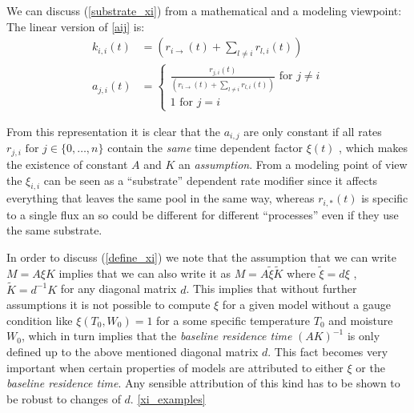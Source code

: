 We can discuss (\ref{substrate_xi}) from a mathematical and a modeling viewpoint:
\newcommand{\kiit}{
      \left(
      r_{i \rightarrow } (t)
      + 
      \sum_{l \ne i} r_{l,i} (t)
      \right)
}
The linear version of \eqref{aij} is: 
\begin{align}
  k_{i,i}(t) &=\kiit \nonumber
  \\
  a_{j,i}(t) &=\left\{
  \begin{matrix}
  \frac{
    r_{j,i} (t)
  }{
    \kiit
  } \text{ for } j \ne i
  \\
  1 \text{ for } j=i
  \end{matrix}
  \right.
  \label{aij}
\end{align}

From this representation it is clear that the $a_{i,j}$ are only constant if all rates $r_{j,i} \text{ for } j \in \{0,\dots ,n \}$ contain the \emph{same} time dependent factor $\xi(t)$ , which makes the existence of constant $A$ and $K$ 
an \emph{assumption}.
From a modeling point of view the $\xi_{i,i}$ can be seen as a ``substrate'' dependent rate modifier since it affects everything that leaves the same pool in the same way, whereas $r_{i,*}(t)$ is specific to a single flux an so could be different for different ``processes'' even if they use the same substrate.


In order to discuss (\ref{define_xi}) we note that the assumption that we can write 
$M=A \xi K$ implies that we can also write it as $M=A \tilde{\xi} \tilde{K}$
where $\tilde{\xi}=d\xi$ , $\tilde{K}=d^{-1} K$ for any diagonal matrix $d$.
This implies that without further assumptions it is not possible to compute $\xi$
for a given model without a gauge condition like $\xi(T_0, W_0)=1$ for a some
specific temperature $T_0$ and moisture $W_0$, which in turn implies that the {\it baseline residence time } $(A K)^{-1}$
is only defined up to the above mentioned diagonal matrix $d$.
This fact becomes very important when certain properties of models are attributed to either $\xi$ or the {\it baseline residence time}.
Any sensible attribution of this kind has to be shown to be robust to changes of $d$.
\ref{xi_examples}
%


